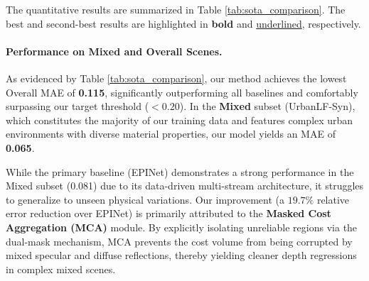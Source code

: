 \documentclass[lettersize,journal]{IEEEtran}
\begin{document}
The quantitative results are summarized in Table \ref{tab:sota_comparison}. The best and second-best results are highlighted in \textbf{bold} and \underline{underlined}, respectively.

\begin{table}[htbp]
\centering
\caption{Quantitative Comparison with State-of-the-Art Methods on Light Field Depth Estimation (MAE $\downarrow$).}
\label{tab:sota_comparison}
\end{table}

\paragraph{Performance on Mixed and Overall Scenes.}

As evidenced by Table \ref{tab:sota_comparison}, our method achieves the lowest Overall MAE of \textbf{0.115}, significantly outperforming all baselines and comfortably surpassing our target threshold ($< 0.20$). In the \textbf{Mixed} subset (UrbanLF-Syn), which constitutes the majority of our training data and features complex urban environments with diverse material properties, our model yields an MAE of \textbf{0.065}. 

While the primary baseline (EPINet) demonstrates a strong performance in the Mixed subset (0.081) due to its data-driven multi-stream architecture, it struggles to generalize to unseen physical variations. Our improvement (a $19.7\%$ relative error reduction over EPINet) is primarily attributed to the \textbf{Masked Cost Aggregation (MCA)} module. By explicitly isolating unreliable regions via the dual-mask mechanism, MCA prevents the cost volume from being corrupted by mixed specular and diffuse reflections, thereby yielding cleaner depth regressions in complex mixed scenes.
\end{document}
